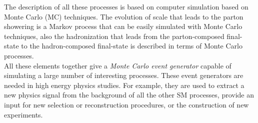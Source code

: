 \noindent The description of all these processes is based on computer simulation based on Monte Carlo (MC) techniques. The evolution of scale that leads to the parton showering is a Markov process that can be easily simulated with Monte Carlo techniques, also the hadronization that leads from the parton-composed final-state to the hadron-composed final-state  is described in terms of Monte Carlo processes.
\\
All these elements together give a \textit{Monte Carlo event generator} capable of simulating a large number of interesting processes. These event generators are needed in high energy physics studies. For  example, they are used to extract a new physics signal from the background of all the other SM processes, provide an input for new selection or reconstruction procedures, or the construction of new experiments.

\medskip

